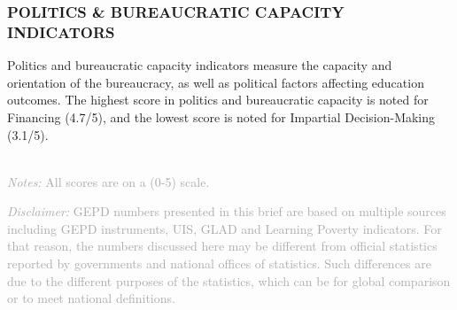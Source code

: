 \documentclass[
  twocolumn]{article}
\begin{document}
\hypertarget{politics-bureaucratic-capacity-indicators}{%
\subsubsection{\texorpdfstring{\textbf{POLITICS \& BUREAUCRATIC CAPACITY
INDICATORS}}{POLITICS \& BUREAUCRATIC CAPACITY INDICATORS}}\label{politics-bureaucratic-capacity-indicators}}

Politics and bureaucratic capacity indicators measure the capacity and
orientation of the bureaucracy, as well as political factors affecting
education outcomes. The highest score in politics and bureaucratic
capacity is noted for Financing (4.7/5), and the lowest score is noted
for Impartial Decision-Making (3.1/5).

\begin{table}[H]
\\

    {\scriptsize
    \textcolor{darkgray}{\textit{Notes:} All scores are on a (0-5) scale.}
  }

\end{table}
\raggedbottom

{\scriptsize
    \textcolor{darkgray}{\textit{Disclaimer:} GEPD numbers presented in this brief are based on multiple sources including GEPD instruments, UIS, GLAD and Learning Poverty indicators. For that reason, the numbers discussed here may be different from official statistics reported by governments and national offices of statistics. Such differences are due to the different purposes of the statistics, which can be for global comparison or to meet national definitions.}
  }
\end{document}
